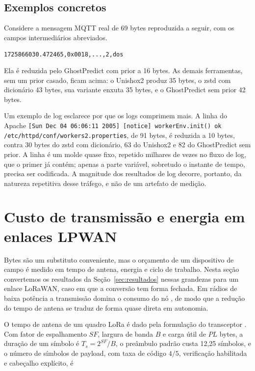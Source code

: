 \documentclass[12pt]{article}
\begin{document}
\subsection{Exemplos concretos}

Considere a mensagem MQTT real de 69 bytes reproduzida a seguir, com os campos
intermediários abreviados.

\begin{center}
\texttt{\small 1725866030.472465,0x0018,...,2,dos}
\end{center}

Ela é reduzida pelo GhostPredict com prior a 16 bytes. As demais ferramentas,
sem um prior casado, ficam acima: o
Unishox2 produz 35 bytes, o zstd com dicionário 43 bytes, sua variante enxuta 35
bytes, e o GhostPredict sem prior 42 bytes.

Um exemplo de log esclarece por que os logs comprimem mais. A linha do Apache
\texttt{[Sun Dec 04 06:06:11 2005] [notice] workerEnv.init() ok
/etc/httpd/conf/workers2.properties}, de 91 bytes, é reduzida a 10 bytes, contra
30 bytes do zstd com dicionário, 63 do Unishox2 e 82 do GhostPredict sem prior.
A linha é um molde quase fixo, repetido milhares de vezes no fluxo de log, que o
primer já contém; apenas a parte variável, sobretudo o instante de tempo,
precisa ser codificada. A magnitude dos resultados de log decorre, portanto, da
natureza repetitiva desse tráfego, e não de um artefato de medição.

\section{Custo de transmissão e energia em enlaces LPWAN}
\label{sec:energia}

Bytes são um substituto conveniente, mas o orçamento de um dispositivo de campo
é medido em tempo de antena, energia e ciclo de trabalho. Nesta seção
convertemos os resultados da Seção~\ref{sec:resultados} nessas grandezas para um
enlace LoRaWAN, caso em que a conversão tem forma fechada. Em rádios de baixa
potência a transmissão domina o consumo do nó \cite{casals:17}, de modo que a
redução do tempo de antena se traduz de forma quase direta em autonomia.

O tempo de antena de um quadro LoRa é dado pela formulação do transceptor
\cite{semtech:20}. Com fator de espalhamento $SF$, largura de banda $B$ e carga
útil de $PL$ bytes, a duração de um símbolo é $T_s = 2^{SF}/B$, o preâmbulo
padrão custa 12,25 símbolos, e o número de símbolos de payload, com taxa de
código $4/5$, verificação habilitada e cabeçalho explícito, é
\end{document}
